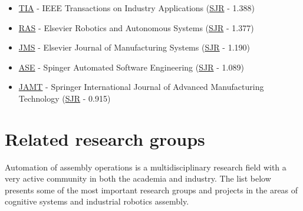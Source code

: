 \begin{itemize}[leftmargin=2em]
	\item \href{http://ieeexplore.ieee.org/xpl/RecentIssue.jsp?punumber=28}{TIA} - IEEE Transactions on Industry Applications (\href{http://www.scimagojr.com/journalsearch.php?q=17361\&tip=sid\&clean=0}{SJR} - 1.388)
	\item \href{http://www.journals.elsevier.com/robotics-and-autonomous-systems/}{RAS} - Elsevier Robotics and Autonomous Systems (\href{http://www.scimagojr.com/journalsearch.php?q=18079\&tip=sid\&clean=0}{SJR} - 1.377)
	\item \href{http://www.journals.elsevier.com/journal-of-manufacturing-systems/}{JMS} - Elsevier Journal of Manufacturing Systems (\href{http://www.scimagojr.com/journalsearch.php?q=14966\&tip=sid\&clean=0}{SJR} - 1.190)
	\item \href{http://www.springer.com/computer/ai/journal/10515}{ASE} - Spinger Automated Software Engineering (\href{http://www.scimagojr.com/journalsearch.php?q=24145\&tip=sid\&clean=0}{SJR} - 1.089)
	\item \href{http://www.springer.com/engineering/production+engineering/journal/170}{JAMT} - Springer International Journal of Advanced Manufacturing Technology (\href{http://www.scimagojr.com/journalsearch.php?q=20428\&tip=sid\&clean=0}{SJR} - 0.915)
\end{itemize}



\section{Related research groups}

Automation of assembly operations is a multidisciplinary research field with a very active community in both the academia and industry. The list below presents some of the most important research groups and projects in the areas of cognitive systems and industrial robotics assembly.

